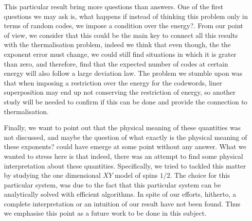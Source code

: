 \indent This particular result bring more questions than answers. One of the first questions we may ask is, what happens if instead of thinking this problem only in terms of random codes, we impose a condition over the energy?. From our point of view, we consider that this could be the main key to connect all this results with the thermalisation problem, indeed we think that even though, the the exponent error must change, we could still find situations in which it is grater than zero, and therefore, find that the expected number of codes at certain energy will also follow a large deviation law. The problem we stumble upon was that when imposing a restriction over the energy for the codewords, liner superposition may end up not conserving the restriction of energy, so another study will be needed to confirm if this can be done and provide the connection to thermalisation.

\indent Finally, we want to point out that the physical meaning of these quantities was not discussed, and maybe the question of  what exactly is the physical meaning of these exponents? could have emerge at some point without any answer. What we wanted to stress here is that indeed, there was an attempt to find some physical interpretation about these quantities. Specifically, we tried to tackled this matter by studying the one dimensional $XY$ model of spins $1/2$. The choice for this particular system, was due to the fact that this particular system can be analytically solved with efficient algorithms. In spite of our efforts, hitherto, a complete interpretation or an intuition of our result have not been found. Thus we emphasise this point as a future work to be done in this subject.




